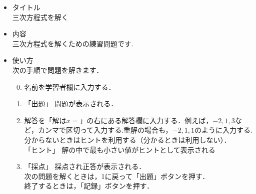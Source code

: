 \documentclass[20]{jarticle}
\begin{document}
\begin{itemize}
\item タイトル\\
三次方程式を解く
\item 内容\\
三次方程式を解くための練習問題です.

\item 使い方\\
次の手順で問題を解きます．
\begin{enumerate}
\setcounter{enumi}{-1}
\item 名前を学習者欄に入力する．
\item 「出題」 問題が表示される．
\item 解答を「解は$x=$」の右にある解答欄に入力する．例えば，$-2,1,3$など，カンマで区切って入力する.重解の場合も，$-2,1,1$のように入力する.\\[1mm]
分からないときはヒントを利用する（分かるときは利用しない）．\\[1mm]
\hspace{1zw}「ヒント」 解の中で最も小さい値がヒントとして表示される\\[1mm]
\item 「採点」 採点され正答が表示される．\\[1mm]
\hspace{2zw}次の問題を解くときは，1に戻って「出題」ボタンを押す．\\[1mm]
\hspace{2zw}終了するときは，「記録」ボタンを押す．


\end{enumerate}

\end{itemize}
\end{document}
